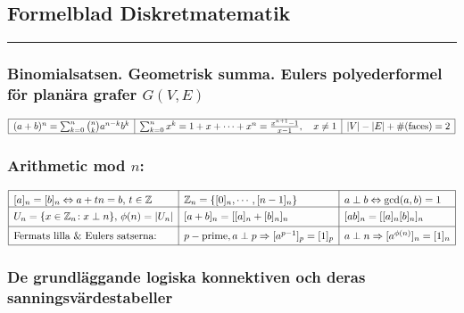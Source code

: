 \documentclass{article}
\let\ergo\Longrightarrow
\newcommand\binom[2]{{#1\choose #2}}
\def\Zone{{\mathbb Z}}
\let\iff\Leftrightarrow
\let\ergo\Rightarrow
\begin{document}
\subsection*{Formelblad Diskretmatematik}
\hrule
\bigskip

\subsubsection*{Binomialsatsen. Geometrisk summa. Eulers polyederformel för planära grafer $G(V,E)$}%
\vspace{-15pt}
\[
  \begin{array}[t]{|l|l|l|}
\hline
  (a+b)^n = \sum_{k=0}^{n} \binom{n}{k} a^{n-k}b^k &
  \sum_{k=0}^{n} x^k = 1 + x  + \cdots +x^n = \frac{x^{n+1}-1}{x-1},\quad x \neq 1 &
  |V|-|E|+ \#(\mbox{faces}) = 2
\\\hline
  \end{array}
\]%

\subsubsection*{Arithmetic mod $n$:} \vspace{-1.2em} %
\[
  \begin{array}[t]{|*{4}{l|}}
    \hline \rule{0pt}{12pt}
     [a]_n=[b]_n\iff a+tn = b,\, t\in \Zone
    & \Zone_n=\{[0]_n,\cdots,[n-1]_n\}
    & a\perp b \iff \gcd(a,b)=1
    \cr
    \hline \rule{0pt}{12pt}
    U_n=\{x\in\Zone_n\!: x\perp n\},\, \phi(n)=|U_n|&
    [a+b]_n = [[a]_n + [b]_n]_n &
    [ab]_n = [[a]_n[b]_n]_n
    \\[3pt] \hline \rule{0pt}{12pt}
    \mbox{Fermats lilla \& Eulers satserna:}
    & p-\mbox{prime}, a\perp p\ergo [a^{p-1}]_p=[1]_p
    & a\perp n\ergo [a^{\phi(n)}]_n=[1]_n\\[2pt]
    \hline
  \end{array}
\]%

\subsubsection*{De grundläggande logiska konnektiven och deras sanningsvärdestabeller}%
\end{document}
